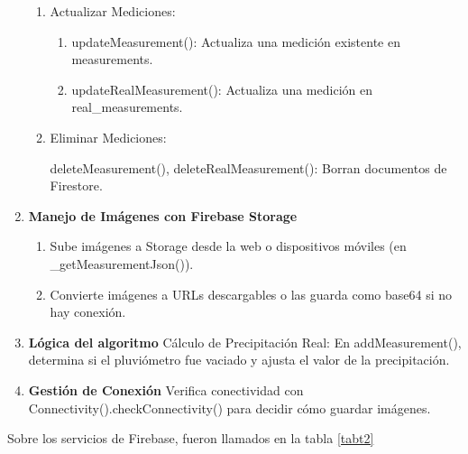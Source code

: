 \begin{enumerate}
\begin{enumerate}
    \item Actualizar Mediciones:
    
    \begin{enumerate}
      \item updateMeasurement(): Actualiza una medición existente en measurements.
    
    \item updateRealMeasurement(): Actualiza una medición en real\_measurements.
    \end{enumerate}
    
    \item Eliminar Mediciones:
    
    deleteMeasurement(), deleteRealMeasurement(): Borran documentos de Firestore.
    \end{enumerate}
    
    \item \textbf{Manejo de Imágenes con Firebase Storage}
    \begin{enumerate}
    \item Sube imágenes a Storage desde la web o dispositivos móviles (en \_getMeasurementJson()).
    
    \item Convierte imágenes a URLs descargables o las guarda como base64 si no hay conexión.
    \end{enumerate}
    
    \item \textbf{Lógica del algoritmo}
    Cálculo de Precipitación Real: En addMeasurement(), determina si el pluviómetro fue vaciado y ajusta el valor de la precipitación.
    
    \item \textbf{Gestión de Conexión}
    Verifica conectividad con Connectivity().checkConnectivity() para decidir cómo guardar imágenes.
\end{enumerate}

Sobre los servicios de Firebase, fueron llamados en la tabla \ref{tabt2}


